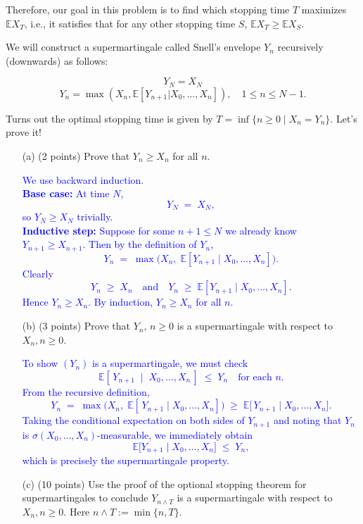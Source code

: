 \documentclass{article}
\begin{document}
Therefore, our goal in this problem is to find which stopping time $T$ maximizes $\mathbb{E}X_T$, i.e., it satisfies that for any other stopping time $S$, $\mathbb{E}X_T \geq \mathbb{E}X_S$.

We will construct a supermartingale called Snell’s envelope $Y_n$ recursively (downwards) as follows:

\[
Y_N = X_N
\]
\[
Y_n = \max(X_n, \mathbb{E}[Y_{n+1} | X_0, \ldots, X_n]), \quad 1 \leq n \leq N-1.
\]

Turns out the optimal stopping time is given by $T = \inf\{n \geq 0 \mid X_n = Y_n\}$. Let’s prove it!

\begin{enumerate}
    \item[(a)] (2 points) Prove that $Y_n \geq X_n$ for all $n$.

        \textcolor{blue}{We use backward induction. \\
\noindent
\textbf{Base case:} At time $N$,
\[
Y_N \;=\; X_N,
\]
so $Y_N \geq X_N$ trivially. \\
\noindent
\textbf{Inductive step:} Suppose for some $n+1\le N$ we already know $Y_{n+1}\ge X_{n+1}$. Then by the definition of $Y_n$,
\[
Y_n
\;=\;
\max\bigl(X_n,\;\mathbb{E}[Y_{n+1}\mid X_0,\ldots,X_n]\bigr).
\]
Clearly
\[
Y_n \;\geq\; X_n
\quad\text{and}\quad
Y_n \;\geq\; \mathbb{E}[Y_{n+1}\mid X_0,\ldots,X_n].
\]
Hence $Y_n \ge X_n$. By induction, $Y_n \geq X_n$ for all $n$.
}
    
    \item[(b)] (3 points) Prove that $Y_n$, $n \geq 0$ is a supermartingale with respect to $X_n, n \geq 0$.
    
        \textcolor{blue}{
            To show $(Y_n)$ is a supermartingale, we must check
\[
\mathbb{E}[\,Y_{n+1} \;\mid\; X_0,\ldots,X_n\,] \;\le\; Y_n
\quad
\text{for each } n.
\]
From the recursive definition,
\[
Y_n
\;=\;
\max\bigl(X_n,\;\mathbb{E}[\,Y_{n+1}\mid X_0,\ldots,X_n]\bigr)
\;\geq\;
\mathbb{E}\bigl[\,Y_{n+1}\mid X_0,\ldots,X_n\bigr].
\]
Taking the conditional expectation on both sides of $Y_{n+1}$ and noting that $Y_n$ is $\sigma(X_0,\ldots,X_n)$-measurable, we immediately obtain
\[
\mathbb{E}\bigl[Y_{n+1}\mid X_0,\ldots,X_n\bigr]
\;\le\;
Y_n,
\]
which is precisely the supermartingale property.
        }

    \item[(c)] (10 points) Use the proof of the optional stopping theorem for supermartingales to conclude $Y_{n \wedge T}$ is a supermartingale with respect to $X_n, n \geq 0$. Here $n \wedge T := \min\{n, T\}$.


\end{enumerate}
\end{document}
